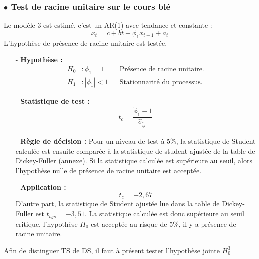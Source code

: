 \subsubsection*{$\bullet$ Test de racine unitaire sur le cours blé}
Le modèle 3 est estimé, c'est un AR(1) avec tendance et constante :
\begin{equation*}
    x_{t} = c + bt + \phi_{1} x_{t-1} + a_{t}
\end{equation*}
L'hypothèse de présence de racine unitaire est testée.
%
\begin{itemize}
\item[-]\textbf{ Hypothèse :} 
\begin{align*}
    H_{0} &: \phi_{1} = 1  & &\text{Présence de racine unitaire.}\\
    H_{1} &:|\phi_{1}| < 1   &  &\text{Stationnarité du processus.}
\end{align*}
\item[-]\textbf{Statistique de test :} 
\begin{equation*}
    t_{c} = \frac{\tilde{\phi}_{1}- 1}{\hat{\sigma}_{\tilde{\phi}_{1}}}
\end{equation*}
\item[-]\textbf{Règle de décision :} Pour un niveau de test à 5\%, la statistique de Student calculée est ensuite comparée à la statistique de student ajustée de la table 
de Dickey-Fuller (annexe). Si la statistique calculée est supérieure au seuil, alors l'hypothèse nulle de présence de racine unitaire est acceptée.
\item[-]\textbf{Application :} 
\begin{equation*}
    t_{c} = -2,67
\end{equation*}
D'autre part, la statistique de Student ajustée lue dans la table de Dickey-Fuller est $t_{ajs} = - 3,51$. La statistique calculée est donc supérieure au seuil critique,
l'hypothèse $H_{0}$ est acceptée au risque de 5\%, il y a présence de racine unitaire.
\end{itemize}
%
Afin de distinguer TS de DS, il faut à présent tester l'hypothèse jointe $H_{0}^{3}$
%
